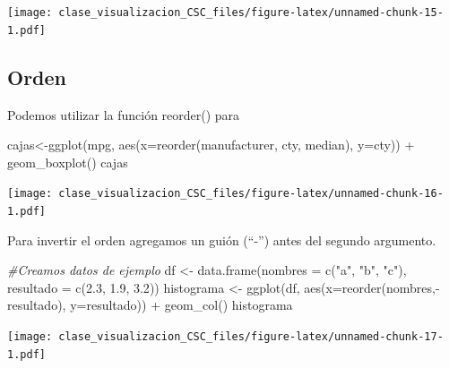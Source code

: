 \documentclass[
]{book}
\newenvironment{Shaded}{\begin{snugshade}}{\end{snugshade}}
\newcommand{\AttributeTok}[1]{\textcolor[rgb]{0.77,0.63,0.00}{#1}}
\newcommand{\CommentTok}[1]{\textcolor[rgb]{0.56,0.35,0.01}{\textit{#1}}}
\newcommand{\FloatTok}[1]{\textcolor[rgb]{0.00,0.00,0.81}{#1}}
\newcommand{\FunctionTok}[1]{\textcolor[rgb]{0.00,0.00,0.00}{#1}}
\newcommand{\NormalTok}[1]{#1}
\newcommand{\OtherTok}[1]{\textcolor[rgb]{0.56,0.35,0.01}{#1}}
\newcommand{\SpecialCharTok}[1]{\textcolor[rgb]{0.00,0.00,0.00}{#1}}
\newcommand{\StringTok}[1]{\textcolor[rgb]{0.31,0.60,0.02}{#1}}
\begin{document}
\texttt{[image: clase\_visualizacion\_CSC\_files/figure-latex/unnamed-chunk-15-1.pdf]}

\hypertarget{orden}{%
\subsection{Orden}\label{orden}}

Podemos utilizar la función reorder() para

\begin{Shaded}
\begin{Highlighting}[]
\NormalTok{cajas}\OtherTok{\textless{}{-}}\FunctionTok{ggplot}\NormalTok{(mpg, }\FunctionTok{aes}\NormalTok{(}\AttributeTok{x=}\FunctionTok{reorder}\NormalTok{(manufacturer, cty, median), }\AttributeTok{y=}\NormalTok{cty)) }\SpecialCharTok{+} 
    \FunctionTok{geom\_boxplot}\NormalTok{()}
\NormalTok{cajas}
\end{Highlighting}
\end{Shaded}

\texttt{[image: clase\_visualizacion\_CSC\_files/figure-latex/unnamed-chunk-16-1.pdf]}

Para invertir el orden agregamos un guión (``-'') antes del segundo argumento.

\begin{Shaded}
\begin{Highlighting}[]
\CommentTok{\#Creamos datos de ejemplo }
\NormalTok{df }\OtherTok{\textless{}{-}} \FunctionTok{data.frame}\NormalTok{(}\AttributeTok{nombres =} \FunctionTok{c}\NormalTok{(}\StringTok{"a"}\NormalTok{, }\StringTok{"b"}\NormalTok{, }\StringTok{"c"}\NormalTok{), }\AttributeTok{resultado =} \FunctionTok{c}\NormalTok{(}\FloatTok{2.3}\NormalTok{, }\FloatTok{1.9}\NormalTok{, }\FloatTok{3.2}\NormalTok{))}
\NormalTok{histograma }\OtherTok{\textless{}{-}} \FunctionTok{ggplot}\NormalTok{(df, }\FunctionTok{aes}\NormalTok{(}\AttributeTok{x=}\FunctionTok{reorder}\NormalTok{(nombres,}\SpecialCharTok{{-}}\NormalTok{resultado), }\AttributeTok{y=}\NormalTok{resultado)) }\SpecialCharTok{+} 
  \FunctionTok{geom\_col}\NormalTok{()}
\NormalTok{histograma}
\end{Highlighting}
\end{Shaded}

\texttt{[image: clase\_visualizacion\_CSC\_files/figure-latex/unnamed-chunk-17-1.pdf]}

  
\end{document}
